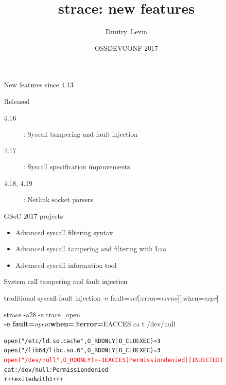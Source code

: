 \documentclass[unicode]{beamer}
\title{\Huge strace: new features}
\author{\Huge Dmitry~Levin}
\date{OSSDEVCONF 2017}
\begin{document}
\begin{frame}
\titlepage
\end{frame}

\begin{frame}{New features since 4.13}
\begin{block}{\large Released}
\begin{description}
	\item[4.16]: Syscall tampering and fault injection
	\item[4.17]: Syscall specification improvements
	\item[4.18, 4.19]: Netlink socket parsers
\end{description}
\end{block}
\begin{block}{\large GSoC 2017 projects}
\begin{itemize}
	\item Advanced syscall filtering syntax
	\item Advanced syscall tampering and filtering with Lua
	\item Advanced syscall information tool
\end{itemize}
\end{block}
\end{frame}

\begin{frame}[fragile]{System call tampering and fault injection}
\begin{block}{\large traditional syscall fault injection}
-e fault=\textit{set}[:error=\textit{errno}][:when=\textit{expr}]
\end{block}
\begin{block}{\large strace -a28 -e trace=open \\ {\bf -e fault=}{\it open}{\bf :when=}{\it 3}{\bf :error=}{\sc EACCES} ca
t /dev/null}
\begin{alltt}
open("/etc/ld.so.cache", O_RDONLY|O_CLOEXEC) = 3
open("/lib64/libc.so.6", O_RDONLY|O_CLOEXEC) = 3
\textcolor{red}{open("/dev/null", O_RDONLY) = -1 EACCES (Permission denied) (INJECTED)}
cat: /dev/null: Permission denied
+++ exited with 1 +++
\end{alltt}
\end{block}
\end{frame}
\end{document}
